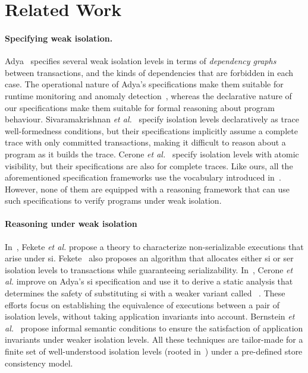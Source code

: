 \vspace*{-6pt}
\section{Related Work}
\label{sec:relatedwork}

\paragraph{Specifying weak isolation.}
Adya~\cite{adyaphd} specifies several weak isolation levels in terms
of \emph{dependency graphs} between transactions, and the kinds of
dependencies that are forbidden in each case. The operational nature
of Adya's specifications make them suitable for runtime monitoring and
anomaly detection~\cite{kemmevldb,feketesigmod08,pssi2011}, whereas
the declarative nature of our specifications make them suitable for
formal reasoning about program behaviour. Sivaramakrishnan \emph{et
al.}~\cite{pldi15} specify isolation levels declaratively as trace
well-formedness conditions, but their specifications implicitly assume
a complete trace with only committed transactions, making it difficult
to reason about a program as it builds the trace. Cerone \emph{et
al.}~\cite{gotsmanconcur15} specify isolation levels with atomic
visibility, but their specifications are also for complete traces.
Like ours, all the aforementioned specification frameworks use the
vocabulary introduced in~\cite{burckhardt14}. However, none of them
are equipped with a reasoning framework that can use such
specifications to verify programs under weak isolation.

\vspace*{-4pt}
\paragraph{Reasoning under weak isolation} In~\cite{feketessi}, Fekete
\emph{et al.} propose a theory to characterize non-serializable
executions that arise under {\sc si}. Fekete~\cite{fekete2005} also
proposes an algorithm that allocates either {\sc si} or {\sc ser}
isolation levels to transactions while guaranteeing
serializability. In~\cite{gotsmanpodc16}, Cerone \emph{et al.} improve
on Adya's {\sc si} specification and use it to derive a static
analysis that determines the safety of substituting {\sc si} with a
weaker variant called ~\cite{psi}.
These efforts focus on establishing the equivalence of executions
between a pair of isolation levels, without taking application
invariants into account.  Bernstein \emph{et al.}~\cite{bern2000}
propose informal semantic conditions to ensure the satisfaction of
application invariants under weaker isolation levels.  All these
techniques are tailor-made for a finite set of well-understood
isolation levels (rooted in~\cite{berenson}) under a pre-defined store
consistency model.

